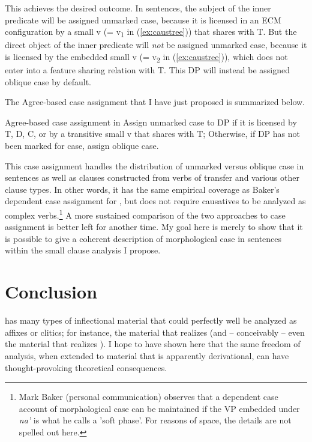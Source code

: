\documentclass[output=paper,
modfonts
]{LSP/langsci}
\begin{document}
\begin{exe}
\begin{xlist}
This achieves the desired outcome. In  sentences, the subject
of the inner predicate will be assigned unmarked case, because it is
licensed in an ECM configuration by a small v (= v\textsubscript{1} in
(\ref{ex:caustree})) that shares  with T. But the direct object of the inner
predicate will \emph{not} be assigned unmarked case, because it is
licensed by the embedded small v (= v\textsubscript{2} in (\ref{ex:caustree})), which
does not enter into a feature sharing relation with T. This DP will
instead be assigned oblique case by default.

The Agree-based case assignment that I have just proposed is summarized
below.

\ea \label{ex:chung:36} Agree-based case assignment in 
	\ea \label{ex:chung:36a} Assign unmarked case to DP if it is licensed by T, D, C, or by a
transitive small v that shares  with T;
	\ex \label{ex:chung:36b} Otherwise, if DP has not been marked for case, assign oblique case.
	\z
\z

This case assignment handles the distribution of unmarked versus oblique
case in  sentences as well as clauses constructed from verbs of
transfer and various other clause types. In other words, it has the same
empirical coverage as Baker's dependent case assignment for ,
but does not require causatives to be analyzed as complex
verbs.\footnote{Mark Baker (personal communication) observes that a
  dependent case account of  morphological case can be
  maintained if the VP embedded under \emph{na'} is what he calls a
  'soft phase'. For reasons of space, the details are not spelled out
  here.} A more sustained comparison of the two approaches to 
case assignment is better left for another time. My goal here is merely
to show that it is possible to give a coherent description of
morphological case in  sentences within the small clause
analysis I propose. 

\section{Conclusion}\label{sec:chung:8}

 has many types of inflectional material that could perfectly
well be analyzed as affixes or clitics; for instance, the material that
realizes  (and -- conceivably -- even the
material that realizes ). I hope to have shown here that
the same freedom of analysis, when extended to material that is
apparently derivational, can have thought-provoking theoretical
consequences.



\end{xlist}
\end{exe}
\end{document}
